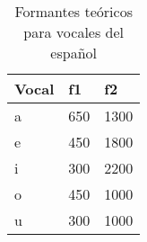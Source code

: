 \begin{table}[H]
\centering
\caption{Formantes teóricos para vocales del español}
\label{tab:formantes_teoricos}
\begin{tabular}{|l|l|l|}
\textbf{Vocal} & \textbf{f1} & \textbf{f2} \\ \hline
a   & 650 & 1300 \\ \hline
e   & 450 & 1800 \\ \hline
i   & 300 & 2200 \\ \hline
o   & 450 & 1000 \\ \hline
u   & 300 & 1000 \\ \hline

\end{tabular}
\end{table}